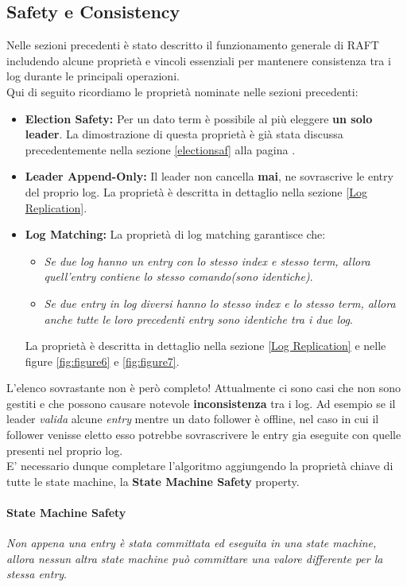 \subsection{Safety e Consistency}
Nelle sezioni precedenti è stato descritto il funzionamento generale di RAFT includendo alcune proprietà e vincoli essenziali per mantenere consistenza tra i log durante le principali operazioni.\\
Qui di seguito ricordiamo le proprietà nominate nelle sezioni precedenti:

\begin{itemize}
	\item{\textbf{Election Safety:}} 
  Per un dato term è possibile al più eleggere \textbf{un solo leader}.
	La dimostrazione di questa proprietà è già stata discussa precedentemente nella sezione \ref{electionsaf} alla pagina \pageref{electionsaf}.
	\item{\textbf{Leader Append-Only:}}
  Il leader non cancella \textbf{mai}, ne sovrascrive le entry del proprio log.
  La proprietà è descritta in dettaglio nella sezione \ref{Log Replication}.
	\item{\textbf{Log Matching:}}
  La proprietà di log matching garantisce che:
	\begin{itemize}
		\item{\emph{Se due log hanno un entry con lo stesso index e stesso term, allora quell'entry contiene lo stesso comando(sono identiche)}}.
		\item{\emph{Se due \textit{entry} in log diversi hanno lo stesso index e lo stesso term, allora anche tutte le loro precedenti entry sono identiche tra i due log}}.
	\end{itemize}
	La proprietà è descritta in dettaglio nella sezione \ref{Log Replication} e nelle figure  \ref{fig:figure6} e \ref{fig:figure7}.
\end{itemize}
L'elenco sovrastante non è però completo! Attualmente ci sono casi che non sono gestiti e che possono causare notevole \textbf{inconsistenza} tra i log.
Ad esempio se il leader \textit{valida} alcune \textit{entry} mentre un dato follower è offline, nel caso in cui il follower venisse eletto esso potrebbe sovrascrivere le entry gia eseguite con quelle presenti nel proprio log.\\
E' necessario dunque completare l'algoritmo aggiungendo la proprietà chiave di tutte le state machine, la \textbf{State Machine Safety} property. 

  \paragraph{State Machine Safety}
  \emph{Non appena una entry è stata committata ed eseguita in una state machine, allora nessun altra state machine può committare una valore differente per la stessa entry}.



